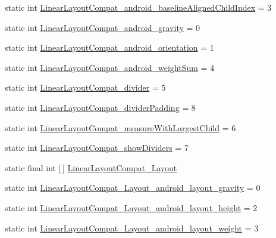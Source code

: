 \begin{DoxyCompactItemize}
\item 
static int \hyperlink{classandroid_1_1support_1_1v7_1_1cardview_1_1R_1_1styleable_a4d14d09d5046c55861bd2bec052dadc6}{Linear\+Layout\+Compat\+\_\+android\+\_\+baseline\+Aligned\+Child\+Index} = 3
\item 
static int \hyperlink{classandroid_1_1support_1_1v7_1_1cardview_1_1R_1_1styleable_a79860f1d2dcf6184afd98a5a4c05c4d3}{Linear\+Layout\+Compat\+\_\+android\+\_\+gravity} = 0
\item 
static int \hyperlink{classandroid_1_1support_1_1v7_1_1cardview_1_1R_1_1styleable_a14c04fc78fe9e84448ae5d48136d1863}{Linear\+Layout\+Compat\+\_\+android\+\_\+orientation} = 1
\item 
static int \hyperlink{classandroid_1_1support_1_1v7_1_1cardview_1_1R_1_1styleable_acc1a68c6378bbcabe87187876d00b531}{Linear\+Layout\+Compat\+\_\+android\+\_\+weight\+Sum} = 4
\item 
static int \hyperlink{classandroid_1_1support_1_1v7_1_1cardview_1_1R_1_1styleable_ae493358d79f8ffabc299fa9e157f0537}{Linear\+Layout\+Compat\+\_\+divider} = 5
\item 
static int \hyperlink{classandroid_1_1support_1_1v7_1_1cardview_1_1R_1_1styleable_adab5ae000e1bad33383cace0ae37b88f}{Linear\+Layout\+Compat\+\_\+divider\+Padding} = 8
\item 
static int \hyperlink{classandroid_1_1support_1_1v7_1_1cardview_1_1R_1_1styleable_a23dc8b1f6679ad6ed9cc4175980386da}{Linear\+Layout\+Compat\+\_\+measure\+With\+Largest\+Child} = 6
\item 
static int \hyperlink{classandroid_1_1support_1_1v7_1_1cardview_1_1R_1_1styleable_a283ec7224bcb5e6c731bcef2e91802f0}{Linear\+Layout\+Compat\+\_\+show\+Dividers} = 7
\item 
static final int \mbox{[}$\,$\mbox{]} \hyperlink{classandroid_1_1support_1_1v7_1_1cardview_1_1R_1_1styleable_a7340b53bc5e0f0d0fbff100b36717ee2}{Linear\+Layout\+Compat\+\_\+\+Layout}
\item 
static int \hyperlink{classandroid_1_1support_1_1v7_1_1cardview_1_1R_1_1styleable_a87d2342b6ef4ee1fad3dff9b4d492976}{Linear\+Layout\+Compat\+\_\+\+Layout\+\_\+android\+\_\+layout\+\_\+gravity} = 0
\item 
static int \hyperlink{classandroid_1_1support_1_1v7_1_1cardview_1_1R_1_1styleable_af747baf1f87dcca03c3b8c31979c4045}{Linear\+Layout\+Compat\+\_\+\+Layout\+\_\+android\+\_\+layout\+\_\+height} = 2
\item 
static int \hyperlink{classandroid_1_1support_1_1v7_1_1cardview_1_1R_1_1styleable_a576511bf33bbd8148b568b3262bb45ab}{Linear\+Layout\+Compat\+\_\+\+Layout\+\_\+android\+\_\+layout\+\_\+weight} = 3

\end{DoxyCompactItemize}
